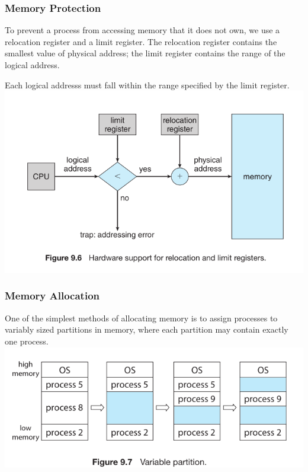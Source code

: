 \documentclass[10pt]{article}
\begin{document}
\subsubsection{Memory Protection}

\par{To prevent a process from accessing memory that it does not own, we use a relocation register and a limit register. The relocation register contains the smallest value of physical address; the limit register contains the range of the logical address.} \\

\par{Each logical addresss must fall within the range specified by the limit register.} \\

\bigbreak
\includegraphics[scale = 0.7]{memory-protection.png}
\bigbreak

\subsubsection{Memory Allocation}

\par{One of the simplest methods of allocating memory is to assign processes to variably sized partitions in memory, where each partition may contain exactly one process.} \\

\bigbreak
\includegraphics[scale = 0.7]{Variable_partition.png}
\bigbreak
\end{document}
